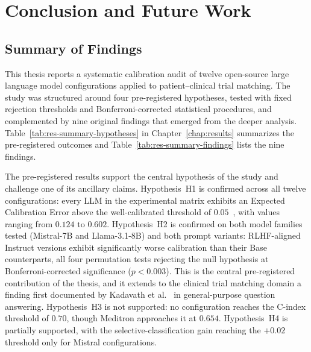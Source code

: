 
\chapter{Conclusion and Future Work}
\label{chap:conclusion}

\section{Summary of Findings}
\label{sec:conc-summary}

This thesis reports a systematic calibration audit of twelve open-source 
large language model configurations applied to patient--clinical trial 
matching. The study was structured around four pre-registered hypotheses, 
tested with fixed rejection thresholds and Bonferroni-corrected 
statistical procedures, and complemented by nine original findings that 
emerged from the deeper analysis. Table~\ref{tab:res-summary-hypotheses} 
in Chapter~\ref{chap:results} summarizes the pre-registered outcomes 
and Table~\ref{tab:res-summary-findings} lists the nine findings.

The pre-registered results support the central hypothesis of the study 
and challenge one of its ancillary claims. Hypothesis~H1 is confirmed 
across all twelve configurations: every LLM in the experimental matrix 
exhibits an Expected Calibration Error above the well-calibrated 
threshold of $0.05$~\cite{vancalster2019calibration}, with values 
ranging from $0.124$ to $0.602$. Hypothesis~H2 is confirmed on both 
model families tested (Mistral-7B and Llama-3.1-8B) and both prompt 
variants: RLHF-aligned Instruct versions exhibit significantly worse 
calibration than their Base counterparts, all four permutation tests 
rejecting the null hypothesis at Bonferroni-corrected significance 
($p < 0.003$). This is the central pre-registered contribution of the 
thesis, and it extends to the clinical trial matching domain a finding 
first documented by Kadavath et al.~\cite{kadavath2022know} in 
general-purpose question answering. Hypothesis~H3 is not supported: no 
configuration reaches the C-index threshold of $0.70$, though Meditron 
approaches it at $0.654$. Hypothesis~H4 is partially supported, with 
the selective-classification gain reaching the $+0.02$ threshold only 
for Mistral configurations.


